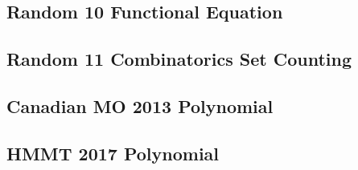 \subsection{Random 10 Functional Equation}

\newpage

\subsection{Random 11 Combinatorics Set Counting}

\newpage

\subsection{Canadian MO 2013 Polynomial}

\newpage

\subsection{HMMT 2017 Polynomial}
